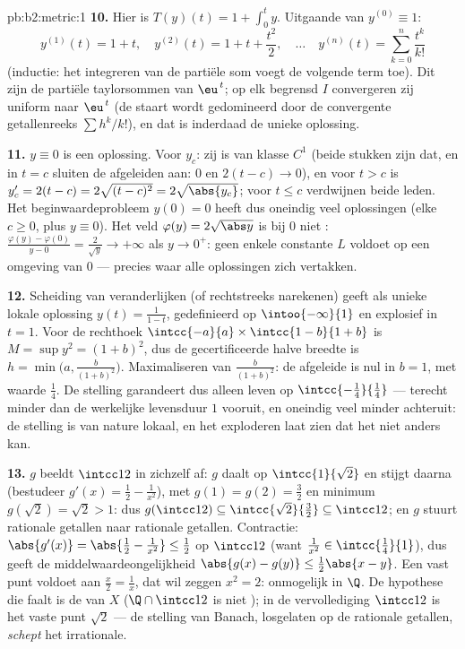 \begin{solution}{pb:b2:metric:1}
\textbf{10.} Hier is $T(y)(t) = 1 + \int_0^t y$. Uitgaande van
$y^{(0)} \equiv 1$:
\[
y^{(1)}(t) = 1 + t,\quad
y^{(2)}(t) = 1 + t + \frac{t^2}2,\quad\dots\quad
y^{(n)}(t) = \sum_{k=0}^{n}\frac{t^k}{k!}
\]
(inductie: het integreren van de partiële som voegt de volgende
term toe). Dit zijn de partiële taylorsommen van $\eu^{\,t}$; op
elk begrensd $I$ convergeren zij uniform naar $\eu^{\,t}$ (de
staart wordt gedomineerd door de convergente getallenreeks $\sum
h^k/k!$), en dat is inderdaad de unieke oplossing.

\textbf{11.} $y \equiv 0$ is een oplossing. Voor $y_c$: zij is van
klasse $C^1$ (beide stukken zijn dat, en in $t = c$ sluiten de
afgeleiden aan: $0$ en $2(t - c) \to 0$), en voor $t > c$ is $y_c'
= 2(t - c) = 2\sqrt{(t-c)^2} = 2\sqrt{\abs{y_c}}$; voor $t \leq c$
verdwijnen beide leden. Het beginwaardeprobleem $y(0) = 0$ heeft
dus oneindig veel oplossingen (elke $c \geq 0$, plus $y \equiv
0$). Het veld $\varphi(y) = 2\sqrt{\abs y}$ is bij $0$ niet
: $\frac{\varphi(y) - \varphi(0)}{y - 0} =
\frac{2}{\sqrt y} \to +\infty$ als $y \to 0^+$: geen enkele
constante $L$ voldoet op een omgeving van $0$ --- precies waar alle
oplossingen zich vertakken.

\textbf{12.} Scheiding van veranderlijken (of rechtstreeks
narekenen) geeft als unieke lokale oplossing $y(t) = \frac1{1 -
t}$, gedefinieerd op $\intoo{-\infty}{1}$ en explosief in $t = 1$.
Voor de rechthoek $\intcc{-a}{a} \times \intcc{1 - b}{1 +
b}$ is $M = \sup y^2 = (1 + b)^2$, dus de gecertificeerde halve
breedte is $h = \min\bigl(a, \frac{b}{(1+b)^2}\bigr)$.
Maximaliseren van $\frac{b}{(1+b)^2}$: de afgeleide is nul in $b =
1$, met waarde $\frac14$. De stelling garandeert dus alleen leven
op $\intcc{-\frac14}{\frac14}$ --- terecht minder dan de
werkelijke levensduur $1$ vooruit, en oneindig veel minder
achteruit: de stelling is van nature lokaal, en het exploderen laat
zien dat het niet anders kan.

\textbf{13.} $g$ beeldt $\intcc12$ in zichzelf af: $g$ daalt op
$\intcc{1}{\sqrt2}$ en stijgt daarna (bestudeer $g'(x) = \frac12 -
\frac1{x^2}$), met $g(1) = g(2) = \frac32$ en minimum $g(\sqrt2) =
\sqrt2 > 1$: dus $g(\intcc12) \subseteq \intcc{\sqrt2}{\frac32}
\subseteq \intcc12$; en $g$ stuurt rationale getallen naar
rationale getallen. Contractie: $\abs{g'(x)} = \abs{\frac12 -
\frac1{x^2}} \leq \frac12$ op $\intcc12$ (want $\frac1{x^2} \in
\intcc{\frac14}{1}$), dus geeft de middelwaardeongelijkheid
$\abs{g(x) - g(y)} \leq \frac12\abs{x - y}$. Een vast punt voldoet
aan $\frac x2 = \frac1x$, dat wil zeggen $x^2 = 2$: onmogelijk in
$\Q$. De hypothese die faalt is de  van $X$ ($\Q \cap
\intcc12$ is niet ); in de vervollediging $\intcc12$ is het
vaste punt $\sqrt2$ --- de stelling van Banach, losgelaten op de
rationale getallen, \emph{schept} het irrationale.


\end{solution}
